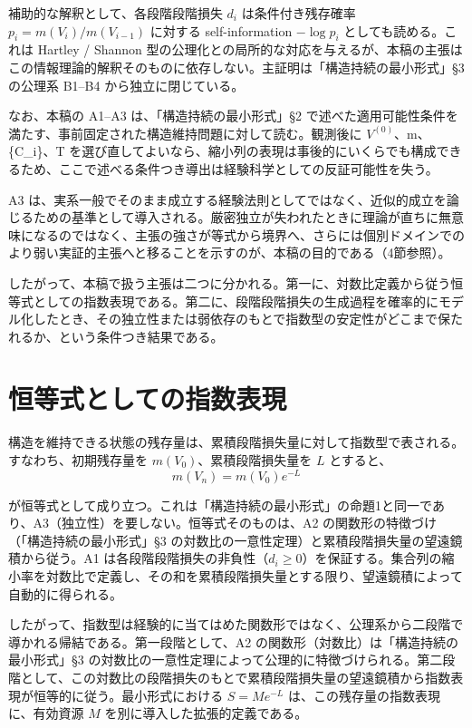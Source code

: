 \documentclass[12pt,a4paper]{article}
\begin{document}
補助的な解釈として、各段階段階損失 \(d_i\) は条件付き残存確率 \(p_i = m(V_i)/m(V_{i-1})\) に対する self-information \(-\log p_i\) としても読める。これは Hartley / Shannon 型の公理化との局所的な対応を与えるが、本稿の主張はこの情報理論的解釈そのものに依存しない。主証明は「構造持続の最小形式」§3 の公理系 B1--B4 から独立に閉じている。

なお、本稿の A1--A3 は、「構造持続の最小形式」§2 で述べた適用可能性条件を満たす、事前固定された構造維持問題に対して読む。観測後に \(V^{(0)}\)、m、\{C\_i\}、T を選び直してよいなら、縮小列の表現は事後的にいくらでも構成できるため、ここで述べる条件つき導出は経験科学としての反証可能性を失う。

A3 は、実系一般でそのまま成立する経験法則としてではなく、近似的成立を論じるための基準として導入される。厳密独立が失われたときに理論が直ちに無意味になるのではなく、主張の強さが等式から境界へ、さらには個別ドメインでのより弱い実証的主張へと移ることを示すのが、本稿の目的である（4節参照）。

したがって、本稿で扱う主張は二つに分かれる。第一に、対数比定義から従う恒等式としての指数表現である。第二に、段階段階損失の生成過程を確率的にモデル化したとき、その独立性または弱依存のもとで指数型の安定性がどこまで保たれるか、という条件つき結果である。

\section{恒等式としての指数表現}\label{ux6052ux7b49ux5f0fux3068ux3057ux3066ux306eux6307ux6570ux8868ux73fe}

構造を維持できる状態の残存量は、累積段階損失量に対して指数型で表される。すなわち、初期残存量を \(m(V_0)\)、累積段階損失量を \(L\) とすると、 \[
m(V_{n}) = m(V_0) e^{-L}
\]

が恒等式として成り立つ。これは「構造持続の最小形式」の命題1と同一であり、A3（独立性）を要しない。恒等式そのものは、A2 の関数形の特徴づけ（「構造持続の最小形式」§3 の対数比の一意性定理）と累積段階損失量の望遠鏡積から従う。A1 は各段階段階損失の非負性（\(d_i \ge 0\)）を保証する。集合列の縮小率を対数比で定義し、その和を累積段階損失量とする限り、望遠鏡積によって自動的に得られる。

したがって、指数型は経験的に当てはめた関数形ではなく、公理系から二段階で導かれる帰結である。第一段階として、A2 の関数形（対数比）は「構造持続の最小形式」§3 の対数比の一意性定理によって公理的に特徴づけられる。第二段階として、この対数比の段階損失のもとで累積段階損失量の望遠鏡積から指数表現が恒等的に従う。最小形式における \(S = M e^{-L}\) は、この残存量の指数表現に、有効資源 \(M\) を別に導入した拡張的定義である。
\end{document}
